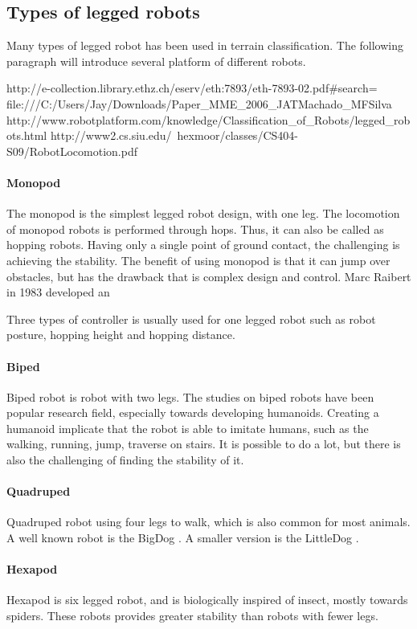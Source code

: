 \documentclass[USenglish]{ifimaster}  %
\begin{document}
\subsection{Types of legged robots}
Many types of legged robot has been used in terrain classification. The following paragraph will introduce several platform of different robots.

http://e-collection.library.ethz.ch/eserv/eth:7893/eth-7893-02.pdf#search=%
file:///C:/Users/Jay/Downloads/Paper_MME_2006_JATMachado_MFSilva%
http://www.robotplatform.com/knowledge/Classification_of_Robots/legged_robots.html
http://www2.cs.siu.edu/~hexmoor/classes/CS404-S09/RobotLocomotion.pdf
\paragraph{Monopod}
The monopod is the simplest legged robot design, with one leg. The locomotion of monopod robots is performed through hops. Thus, it can also be called as hopping robots. Having only a single point of ground contact, the challenging is achieving the stability. The benefit of using monopod is that it can jump over obstacles, but has the drawback that is complex design and control. Marc Raibert in 1983 developed an 

Three types of controller is usually used for one legged robot such as robot posture, hopping height and hopping distance.

\paragraph{Biped}
Biped robot is robot with two legs. The studies on biped robots have been popular research field, especially towards developing humanoids. Creating a humanoid implicate that the robot is able to imitate humans, such as the walking, running, jump, traverse on stairs. It is possible to do a lot, but there is also the challenging of finding the stability of it.  

\paragraph{Quadruped}
Quadruped robot using four legs to walk, which is also common for most animals. A well known robot is the BigDog \cite{Raibert200810822}. A smaller version is the LittleDog \cite{doi:10.1177/0278364910387457}.


\paragraph{Hexapod}
Hexapod is six legged robot, and is biologically inspired of insect, mostly towards spiders. These robots provides greater stability than robots with fewer legs.
\end{document}

